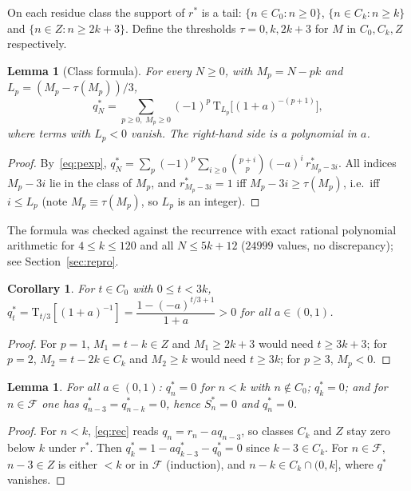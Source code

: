 \documentclass[11pt]{amsart}
\newtheorem{lemma}[theorem]{Lemma}
\newtheorem{corollary}[theorem]{Corollary}
\theoremstyle{definition}
\theoremstyle{remark}
\newcommand{\Tr}{\mathrm{T}}
\newcommand{\Cz}{C_0}
\newcommand{\Ck}{C_k}
\newcommand{\F}{\mathcal{F}}
\begin{document}
On each residue class the support of $r^*$ is a tail: $\{n\in\Cz:n\ge 0\}$,
$\{n\in\Ck:n\ge k\}$ and $\{n\in Z:n\ge 2k+3\}$. Define the thresholds
$\tau=0,k,2k+3$ for $M$ in $\Cz,\Ck,Z$ respectively.

\begin{lemma}[Class formula]\label{lem:W}
For every $N\ge 0$, with $M_p=N-pk$ and $L_p=(M_p-\tau(M_p))/3$,
\[
q^*_N=\sum_{p\ge 0,\;M_p\ge 0}(-1)^p\,\Tr_{L_p}\!\big[(1+a)^{-(p+1)}\big],
\]
where terms with $L_p<0$ vanish. The right-hand side is a polynomial in $a$.
\end{lemma}

\begin{proof}
By~\eqref{eq:pexp}, $q^*_N=\sum_p(-1)^p\sum_{i\ge 0}\binom{p+i}{p}(-a)^i\,r^*_{M_p-3i}$.
All indices $M_p-3i$ lie in the class of $M_p$, and $r^*_{M_p-3i}=1$ iff
$M_p-3i\ge\tau(M_p)$, i.e.\ iff $i\le L_p$ (note $M_p\equiv\tau(M_p)$, so $L_p$ is an integer).
\end{proof}

The formula was checked against the recurrence with exact rational
polynomial arithmetic for $4\le k\le 120$ and all $N\le 5k+12$
($24999$ values, no discrepancy); see Section~\ref{sec:repro}.

\begin{corollary}\label{cor:C0}
For $t\in\Cz$ with $0\le t<3k$,
$q^*_t=\Tr_{t/3}[(1+a)^{-1}]=\dfrac{1-(-a)^{t/3+1}}{1+a}>0$ for all $a\in(0,1)$.
\end{corollary}

\begin{proof}
For $p=1$, $M_1=t-k\in Z$ and $M_1\ge 2k+3$ would need $t\ge 3k+3$; for $p=2$,
$M_2=t-2k\in\Ck$ and $M_2\ge k$ would need $t\ge 3k$; for $p\ge 3$, $M_p<0$.
\end{proof}

\begin{lemma}\label{lem:early}
For all $a\in(0,1)$: $q^*_n=0$ for $n<k$ with $n\notin\Cz$; $q^*_k=0$;
and for $n\in\F$ one has $q^*_{n-3}=q^*_{n-k}=0$, hence $S^*_n=0$ and $q^*_n=0$.
\end{lemma}

\begin{proof}
For $n<k$, \eqref{eq:rec} reads $q_n=r_n-aq_{n-3}$, so classes $\Ck$ and $Z$ stay
zero below $k$ under $r^*$. Then $q^*_k=1-aq^*_{k-3}-q^*_0=0$ since $k-3\in\Ck$.
For $n\in\F$, $n-3\in Z$ is either $<k$ or in $\F$ (induction), and
$n-k\in\Ck\cap(0,k]$, where $q^*$ vanishes.
\end{proof}
\end{document}
